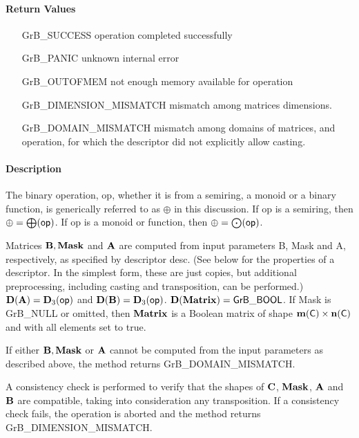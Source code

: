 \paragraph{Return Values}

\begin{itemize}[leftmargin=2.1in]
    \item[{\sf GrB\_SUCCESS}]             operation completed successfully
    \item[{\sf GrB\_PANIC}]               unknown internal error
    \item[{\sf GrB\_OUTOFMEM}]            not enough memory available for operation
    \item[{\sf GrB\_DIMENSION\_MISMATCH}] mismatch among matrices dimensions.
    \item[{\sf GrB\_DOMAIN\_MISMATCH}]    mismatch among domains of matrices, and operation, for which the descriptor did not explicitly allow casting.
\end{itemize}

\paragraph{Description}

The binary operation, {\sf op}, whether it is from a semiring, a monoid or a binary function,
is generically referred to as $\oplus$ in this discussion.
If {\sf op} is a semiring, then $\oplus = \bigoplus({\sf op})$. 
If {\sf op} is a monoid or function, then $\oplus = \bigodot({\sf op})$.

Matrices ${\bf B}, {\bf Mask}$ and ${\bf A}$ are computed from
input parameters {\sf B}, {\sf Mask} and {\sf A}, respectively, as specified
by descriptor {\sf desc}. (See below for the properties of a descriptor. In
the simplest form, these are just copies, but additional preprocessing,
including casting and transposition, can be performed.)  $\bold{D}({\bf A}) =
\bold{D}_3({\sf op})$ and $\bold{D}({\bf B}) = \bold{D}_3({\sf op})$.
$\bold{D}({\bf Matrix}) = {\sf GrB\_BOOL}$.  If {\sf Mask} is {\sf GrB\_NULL} or omitted,
then ${\bf Matrix}$ is a Boolean matrix of shape $\bold{m}({\bf \sf C}) \times \bold{n}({\bf \sf C})$
and with all elements set to {\sf true}.

If either ${\bf B}, {\bf Mask}$ or ${\bf A}$ cannot be computed
from the input parameters as described above, the method returns {\sf
    GrB\_DOMAIN\_MISMATCH}.

A consistency check is performed to verify that the shapes of ${\bf C}$, ${\bf Mask}$, ${\bf A}$ and ${\bf B}$
are compatible, taking into consideration any transposition. If a consistency check fails, the operation is
aborted and the method returns {\sf GrB\_DIMENSION\_MISMATCH}.

